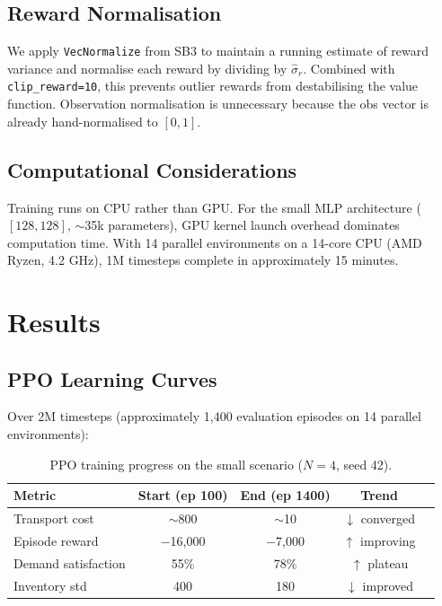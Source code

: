 \documentclass[11pt]{article}
\begin{document}
\subsection{Reward Normalisation}

We apply \texttt{VecNormalize} from SB3 to maintain a running estimate of reward variance and normalise each reward by dividing by $\hat{\sigma}_r$. Combined with \texttt{clip\_reward=10}, this prevents outlier rewards from destabilising the value function. Observation normalisation is unnecessary because the obs vector is already hand-normalised to $[0, 1]$.

\subsection{Computational Considerations}

Training runs on CPU rather than GPU. For the small MLP architecture ($[128, 128]$, $\sim$35k parameters), GPU kernel launch overhead dominates computation time. With 14 parallel environments on a 14-core CPU (AMD Ryzen, 4.2 GHz), 1M timesteps complete in approximately 15 minutes.

\section{Results}

\subsection{PPO Learning Curves}

Over 2M timesteps (approximately 1,400 evaluation episodes on 14 parallel environments):

\begin{table}[H]
\centering
\begin{tabular}{lcccc}
\toprule
Metric & Start (ep 100) & End (ep 1400) & Trend \\
\midrule
Transport cost & $\sim$800 & $\sim$10 & $\downarrow$ converged \\
Episode reward & $-$16,000 & $-$7,000 & $\uparrow$ improving \\
Demand satisfaction & 55\% & 78\% & $\uparrow$ plateau \\
Inventory std & 400 & 180 & $\downarrow$ improved \\
\bottomrule
\end{tabular}
\caption{PPO training progress on the small scenario ($N=4$, seed 42).}
\end{table}
\end{document}
